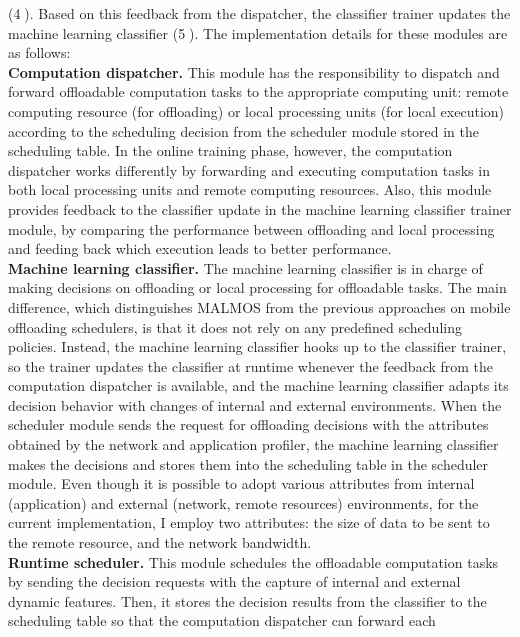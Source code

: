 ({\textcircled{4}).
%
Based on this feedback from the dispatcher, the classifier trainer updates
the machine learning classifier ({\textcircled{5}).
%
The implementation details for these modules are as follows:\\
%
\textbf{Computation dispatcher.} This module has the
responsibility to dispatch and forward offloadable computation tasks to
the appropriate computing unit: remote computing resource (for offloading) or
local processing units (for local execution) according to the scheduling
decision from the scheduler module stored in the scheduling table.
%
In the online training phase, however, the computation dispatcher works
differently by forwarding and executing computation tasks in both local
processing units and remote computing resources.
%
Also, this module provides feedback to the classifier update in the
machine learning classifier trainer module, by comparing the performance
between offloading and local processing and feeding back which execution
leads to better performance.\\
%
\textbf{Machine learning classifier.} The machine learning classifier is
in charge of making decisions on offloading or local processing for
offloadable tasks.
%
The main difference, which distinguishes MALMOS from the previous
approaches on mobile offloading schedulers, is that it does not rely on
any predefined scheduling policies.
%
Instead, the machine learning classifier hooks up to the classifier
trainer, so the trainer updates the classifier at runtime whenever the feedback from
the computation dispatcher is available, and the machine learning
classifier adapts its decision behavior with changes of internal and
external environments.
%
When the scheduler module sends the request for offloading decisions
with the attributes obtained by the network and application profiler,
the machine learning classifier makes the decisions and stores them into
the scheduling table in the scheduler module.
%
Even though it is possible to adopt various attributes
from internal (application) and external (network, remote resources)
environments, for the current implementation, I employ two attributes:
the size of data to be sent to the remote resource, and the network
bandwidth.\\
%
\textbf{Runtime scheduler.} This module schedules the offloadable
computation tasks by sending the decision requests with the capture of
internal and external dynamic features.
%
Then, it stores the decision results from the classifier to the
scheduling table so that the computation dispatcher can forward each
}}
